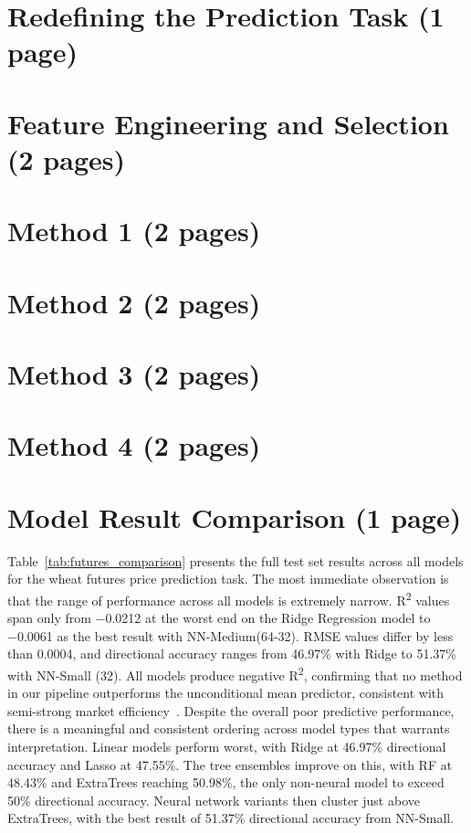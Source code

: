 \documentclass[pdflatex,sn-mathphys-num, oneside]{sn-jnl}%
\theoremstyle{thmstyleone}%
\theoremstyle{thmstyletwo}%
\theoremstyle{thmstylethree}%
\begin{document}
\clearpage

\section{Redefining the Prediction Task (1 page)}\label{sec3}

\clearpage

\section{Feature Engineering and Selection (2 pages)}\label{sec3}

\clearpage

\section{Method 1 (2 pages)}\label{sec3}

\clearpage

\section{Method 2 (2 pages)}\label{sec3}

\clearpage

\section{Method 3 (2 pages)}\label{sec3}

\clearpage

\section{Method 4 (2 pages)}\label{sec3}

\clearpage

\section{Model Result Comparison (1 page)}\label{sec3}
Table~\ref{tab:futures_comparison} presents the full test set results across all models for the wheat futures price prediction task. The most immediate observation is that the range of performance across all models is extremely narrow. R\textsuperscript{2} values span only from −0.0212 at the worst end on the Ridge Regression model to −0.0061 as the best result with NN-Medium(64-32). RMSE values differ by less than 0.0004, and directional accuracy ranges from 46.97\% with Ridge to 51.37\% with NN-Small (32). All models produce negative R\textsuperscript{2}, confirming that no method in our pipeline outperforms the unconditional mean predictor, consistent with semi-strong market efficiency~\cite{bib30}. Despite the overall poor predictive performance, there is a meaningful and consistent ordering across model types that warrants interpretation. Linear models perform worst, with Ridge at 46.97\% directional accuracy and Lasso at 47.55\%. The tree ensembles improve on this, with RF at 48.43\% and ExtraTrees reaching 50.98\%, the only non-neural model to exceed 50\% directional accuracy. Neural network variants then cluster just above ExtraTrees, with the best result of 51.37\% directional accuracy from NN-Small.
\end{document}
